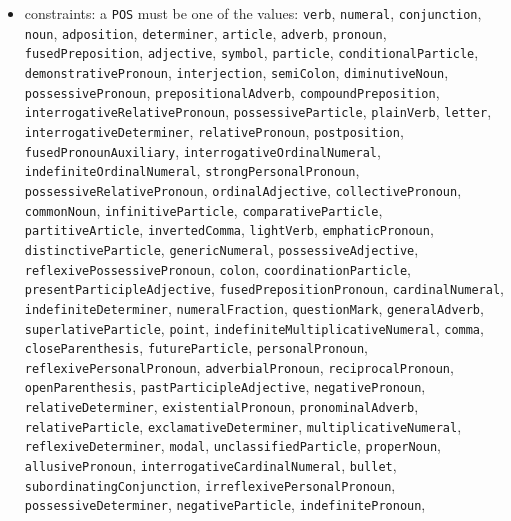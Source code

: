 \begin{itemize}
  \begin{itemize}
  \item
    constraints: a \texttt{POS} must be one of the values:
    \texttt{verb}, \texttt{numeral}, \texttt{conjunction},
    \texttt{noun}, \texttt{adposition}, \texttt{determiner},
    \texttt{article}, \texttt{adverb}, \texttt{pronoun},
    \texttt{fusedPreposition}, \texttt{adjective}, \texttt{symbol},
    \texttt{particle}, \texttt{conditionalParticle},
    \texttt{demonstrativePronoun}, \texttt{interjection},
    \texttt{semiColon}, \texttt{diminutiveNoun},
    \texttt{possessivePronoun}, \texttt{prepositionalAdverb},
    \texttt{compoundPreposition}, \texttt{interrogativeRelativePronoun},
    \texttt{possessiveParticle}, \texttt{plainVerb}, \texttt{letter},
    \texttt{interrogativeDeterminer}, \texttt{relativePronoun},
    \texttt{postposition}, \texttt{fusedPronounAuxiliary},
    \texttt{interrogativeOrdinalNumeral},
    \texttt{indefiniteOrdinalNumeral}, \texttt{strongPersonalPronoun},
    \texttt{possessiveRelativePronoun}, \texttt{ordinalAdjective},
    \texttt{collectivePronoun}, \texttt{commonNoun},
    \texttt{infinitiveParticle}, \texttt{comparativeParticle},
    \texttt{partitiveArticle}, \texttt{invertedComma},
    \texttt{lightVerb}, \texttt{emphaticPronoun},
    \texttt{distinctiveParticle}, \texttt{genericNumeral},
    \texttt{possessiveAdjective}, \texttt{reflexivePossessivePronoun},
    \texttt{colon}, \texttt{coordinationParticle},
    \texttt{presentParticipleAdjective},
    \texttt{fusedPrepositionPronoun}, \texttt{cardinalNumeral},
    \texttt{indefiniteDeterminer}, \texttt{numeralFraction},
    \texttt{questionMark}, \texttt{generalAdverb},
    \texttt{superlativeParticle}, \texttt{point},
    \texttt{indefiniteMultiplicativeNumeral}, \texttt{comma},
    \texttt{closeParenthesis}, \texttt{futureParticle},
    \texttt{personalPronoun}, \texttt{reflexivePersonalPronoun},
    \texttt{adverbialPronoun}, \texttt{reciprocalPronoun},
    \texttt{openParenthesis}, \texttt{pastParticipleAdjective},
    \texttt{negativePronoun}, \texttt{relativeDeterminer},
    \texttt{existentialPronoun}, \texttt{pronominalAdverb},
    \texttt{relativeParticle}, \texttt{exclamativeDeterminer},
    \texttt{multiplicativeNumeral}, \texttt{reflexiveDeterminer},
    \texttt{modal}, \texttt{unclassifiedParticle}, \texttt{properNoun},
    \texttt{allusivePronoun}, \texttt{interrogativeCardinalNumeral},
    \texttt{bullet}, \texttt{subordinatingConjunction},
    \texttt{irreflexivePersonalPronoun}, \texttt{possessiveDeterminer},
    \texttt{negativeParticle}, \texttt{indefinitePronoun},

\end{itemize}
\end{itemize}

